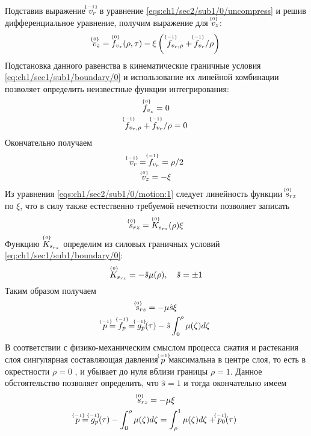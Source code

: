 Подставив выражение $\uindex{v}{-1}_{r}$ в уравнение \cref{eqs:ch1/sec2/sub1/0/uncompress} и решив дифференциальное уравнение, получим выражение для $\uindex{v}{0}_{z}$:
\begin{equation*}
  \uindex{v}{0}_{z} = \uindex{f}{0}_{v_{z}}(\rho, \tau) -\xi \left(\ \uindex{f}{-1}_{v_{r},\rho} + \uindex{f}{-1}_{v_{r}} / \rho\right)
\end{equation*}
Подстановка данного равенства в кинематические граничные условия \cref{eq:ch1/sec1/sub1/boundary/0} и использование их линейной комбинации позволяет определить неизвестные функции интегрирования:
\begin{gather*}
  \uindex{f}{0}_{v_{z}} = 0\\
  \uindex{f}{-1}_{v_{r},\rho} + \uindex{f}{-1}_{v_{r}} / \rho = 0
\end{gather*}
Окончательно получаем
\begin{gather}
  \label{sol:ch1/sec2/sub1/vr/-1}
  \uindex{v}{-1}_{r} = \uindex{f}{-1}_{v_{r}} = \rho / 2
  \\
  \label{sol:ch1/sec2/sub1/vz/0}
  \uindex{v}{0}_{z} =  -\xi
\end{gather}
Из уравнения \cref{eqs:ch1/sec2/sub1/0/motion:1} следует линейность функции $\uindex{s}{0}_{rz}$ по $\xi$, что в силу также естественно требуемой нечетности позволяет записать
\begin{equation*}
  \uindex{s}{0}_{rz} = \uindex{K}{0}_{s_{rz}}(\rho) \xi
\end{equation*}
Функцию $\uindex{K}{0}_{s_{rz}}$ определим из силовых граничных условий \cref{eq:ch1/sec1/sub1/boundary/0}:
\begin{equation*}
  \uindex{K}{0}_{s_{rz}} = -\hat{s}\mu(\rho), \quad \hat{s} = \pm1
\end{equation*}
Таким образом получаем
\begin{gather*}
  \uindex{s}{0}_{rz} = -\mu \hat{s} \xi
  \\
  \uindex{p}{-1} = \uindex{f}{-1}_{p} = \uindex{g}{-1}_{p}(\tau) - \hat{s} \int_0^\rho \mu(\zeta) d\zeta
\end{gather*}
В соответствии с физико-механическим смыслом процесса сжатия и растекания слоя сингулярная составляющая давления $\uindex{p}{-1}$ максимальна в центре слоя, то есть в окрестности $\rho = 0$ , и убывает до нуля вблизи границы $\rho=1$. Данное обстоятельство позволяет определить, что $\hat{s} = 1$ и тогда окончательно имеем
\begin{gather}
  \label{sol:ch1/sec2/sub1/srz/0}
  \uindex{s}{0}_{rz} = -\mu \xi
  \\
  \label{sol:ch1/sec2/sub1/p/-1}
  \uindex{p}{-1} = \uindex{g}{-1}_{p}(\tau) - \int_0^\rho \mu(\zeta) d\zeta = \int_\rho^1 \mu(\zeta) d\zeta + \uindex{p}{-1}_{0}(\tau)
\end{gather}
